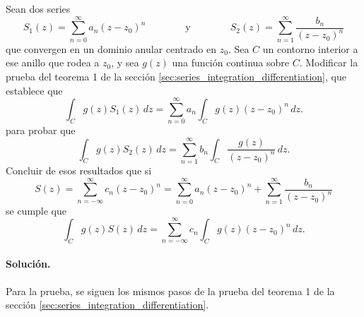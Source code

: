 \documentclass[a4paper]{report}
\begin{document}
Sean dos series
\begin{equation}\label{eq:exercise_72_10_S1_S2}
 S_1(z)=\sum_{n=0}^\infty a_n(z-z_0)^n
 \qquad\qquad\textrm{y}\qquad\qquad
 S_2(z)=\sum_{n=1}^\infty\frac{b_n}{(z-z_0)^n} 
\end{equation}
que convergen en un dominio anular centrado en \(z_0\). Sea \(C\) un contorno interior a ese anillo que rodea a \(z_0\), y sea \(g(z)\) una función continua sobre \(C\). Modificar la prueba del teorema 1 de la sección \ref{sec:series_integration_differentiation}, que establece que 
\[
 \int_C g(z)S_1(z)\,dz=\sum_{n=0}^\infty a_n\int_C g(z)(z-z_0)^n\,dz. 
\]
para probar que 
\begin{equation}\label{eq:series_integration_times_g_negative_power}
 \int_C g(z)S_2(z)\,dz=\sum_{n=1}^\infty b_n\int_C \frac{g(z)}{(z-z_0)^n}\,dz. 
\end{equation}
Concluir de esos resultados que si 
\[
 S(z)=\sum_{n=-\infty}^\infty c_n(z-z_0)^n=\sum_{n=0}^\infty a_n(z-z_0)^n+\sum_{n=1}^\infty\frac{b_n}{(z-z_0)^n}
\]
se cumple que 
\[
 \int_C g(z)S(z)\,dz=\sum_{n=-\infty}^\infty c_n\int_C g(z)(z-z_0)^n\,dz. 
\]

\paragraph{Solución.} Para la prueba, se siguen los mismos pasos de la prueba del teorema 1 de la sección \ref{sec:series_integration_differentiation}. 
\end{document}
